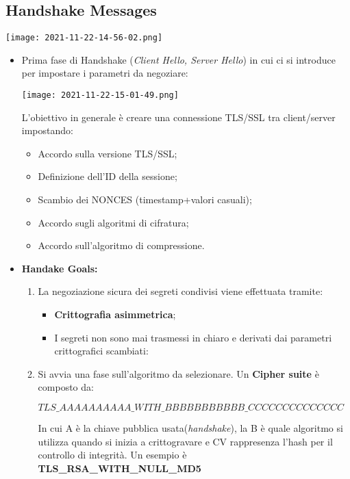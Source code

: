 \documentclass{article}
\theoremstyle{remark}
\begin{document}
\subsection{Handshake Messages}
\begin{center}
    \texttt{[image: 2021-11-22-14-56-02.png]}
\end{center}
\begin{itemize}
    \item Prima fase di Handshake (\emph{Client Hello, Server Hello}) in cui ci si introduce per impostare i parametri da negoziare:
        \begin{center}
            \texttt{[image: 2021-11-22-15-01-49.png]}
        \end{center}
        L'obiettivo in generale è creare una connessione TLS/SSL tra client/server impostando:\begin{itemize}
            \item Accordo sulla versione TLS/SSL;
            \item Definizione dell'ID della sessione;
            \item Scambio dei NONCES (timestamp+valori casuali);
            \item Accordo sugli algoritmi di cifratura;
            \item Accordo sull'algoritmo di compressione.
        \end{itemize}
    \item \textbf{Handake Goals:}\begin{enumerate}
        \item La negoziazione sicura dei segreti condivisi viene effettuata tramite:
        \begin{itemize}
            \item \textbf{Crittografia asimmetrica};
            \item  I segreti non sono mai trasmessi in chiaro e derivati dai parametri crittografici scambiati:
        \end{itemize}
        \item Si avvia una fase sull'algoritmo da selezionare. Un \textbf{Cipher suite} è composto da:\begin{center}
            \(TLS\_AAAAAAAAAA\_WITH\_BBBBBBBBBBB\_CCCCCCCCCCCCCC\)
        \end{center}
        In cui A è la chiave pubblica usata(\emph{handshake}), la B è quale algoritmo si utilizza quando si inizia a crittogravare e CV rappresenza l'hash per il controllo di integrità.
        Un esempio è \textbf{TLS\_RSA\_WITH\_NULL\_MD5}
    \end{enumerate}
\end{itemize}
\end{document}
